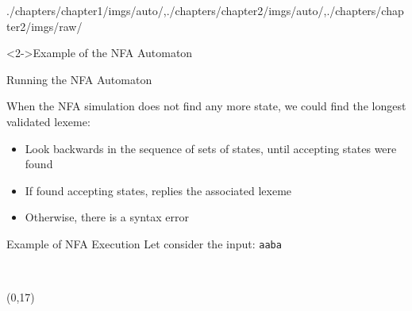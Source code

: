 \begin{graphicspathcontext}{{./chapters/chapter1/imgs/auto/},{./chapters/chapter2/imgs/auto/},{./chapters/chapter2/imgs/raw/}}
\begin{bibunit}[apalike]
\begin{frame}<2->{Example of the NFA Automaton}
\end{frame}

\begin{frame}{Running the NFA Automaton}
	\begin{rightarrowsequence}
	\end{rightarrowsequence}
	\vspace{.5cm}
	When the NFA simulation does not find any more state, we could find the longest validated lexeme: \begin{itemize}
		\item Look backwards in the sequence of sets of states, until accepting states were found
		\item If found accepting states, replies the associated lexeme
		\item Otherwise, there is a syntax error
		\end{itemize}
\end{frame}

\begin{frame}[t]{Example of NFA Execution}
	Let consider the input: \texttt{aaba}
	\begin{center}
		\\
	\end{center}
	\putat(0,17){\parbox[t]{.9\linewidth}{\normalsize\mdseries\normalcolor
		\begin{footnotesize}
		\end{footnotesize}
	}}
\end{frame}


\end{bibunit}
\end{graphicspathcontext}
